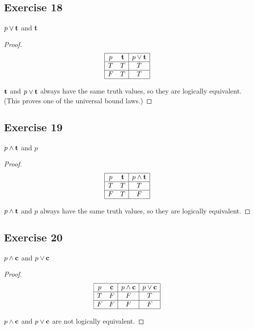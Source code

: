 \documentclass[14pt]{extarticle}
\newcommand{\true}{{\bf t}}
\newcommand{\false}{{\bf c}}
\begin{document}
\subsection{Exercise 18} 
$p \vee \true$ and \true

\begin{proof} 
$$ 
\begin{array}{|cc|c|} 
\hline 
p & \true & p \vee \true \\ 
\hline
T & T & T \\ 
\hline 
F & T & T \\ 
\hline 
\end{array} 
$$

$\true$ and $p \vee \true$ always have the same truth values, so they are logically equivalent. (This proves one of the universal bound laws.)

\end{proof}

\subsection{Exercise 19} 
$p \wedge \true$ and $p$

\begin{proof} 
$$ 
\begin{array}{|cc|c|} 
\hline 
p & \true & p \wedge \true \\
\hline 
T & T & T \\ 
\hline 
F & T & F \\ 
\hline 
\end{array} 
$$

$p \wedge \true$ and $p$ always have the same truth values, so they are logically equivalent. 
\end{proof}

\subsection{Exercise 20} 
$p \wedge \false$ and $p \vee \false$

\begin{proof} 
$$ 
\begin{array}{|cc|c|c|} 
\hline 
p & \false & p \wedge \false & p \vee \false \\ 
\hline 
T & F & F & T \\ 
\hline 
F & F & F & F \\ 
\hline
\end{array} $$

$p \wedge \false$ and $p \vee \false$ are not logically equivalent. 
\end{proof}
\end{document}
